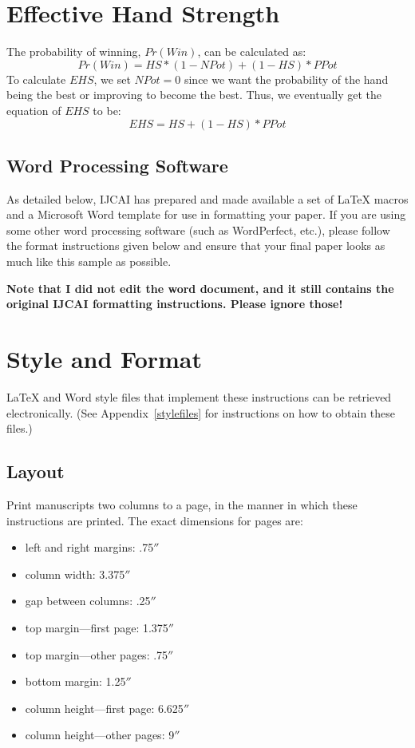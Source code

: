 \documentclass{article}
\begin{document}
\section{Effective Hand Strength}
The probability of winning, $Pr(Win)$, can be calculated as:
\begin{displaymath}
  Pr(Win) = HS * (1-NPot) + (1-HS) * PPot
\end{displaymath}
To calculate $EHS$, we set $NPot=0$ since we want the probability of the hand being the best or improving to become the best. Thus, we eventually get the equation of $EHS$ to be:
\begin{displaymath}
  EHS = HS +(1-HS) * PPot
\end{displaymath}
\fi

\subsection{Word Processing Software}

As detailed below, IJCAI has prepared and made available a set of
\LaTeX{} macros and a Microsoft Word template for use in formatting
your paper. If you are using some other word processing software (such
as WordPerfect, etc.), please follow the format instructions given
below and ensure that your final paper looks as much like this sample
as possible.

{\bf Note that I did not edit the word document, and it still contains the original IJCAI formatting instructions. Please ignore those!}

\section{Style and Format}

\LaTeX{} and Word style files that implement these instructions
can be retrieved electronically. (See Appendix~\ref{stylefiles} for
instructions on how to obtain these files.)

\subsection{Layout}

Print manuscripts two columns to a page, in the manner in which these
instructions are printed. The exact dimensions for pages are:
\begin{itemize}
\item left and right margins: .75$''$
\item column width: 3.375$''$
\item gap between columns: .25$''$
\item top margin---first page: 1.375$''$
\item top margin---other pages: .75$''$
\item bottom margin: 1.25$''$
\item column height---first page: 6.625$''$
\item column height---other pages: 9$''$
\end{itemize}
\end{document}

